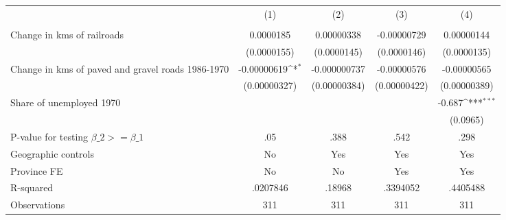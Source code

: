 {
\def\sym#1{\ifmmode^{#1}\else\(^{#1}\)\fi}
\begin{tabular}{l*{4}{c}}
\hline\hline
                &\multicolumn{1}{c}{(1)}&\multicolumn{1}{c}{(2)}&\multicolumn{1}{c}{(3)}&\multicolumn{1}{c}{(4)}\\
                &\multicolumn{1}{c}{}&\multicolumn{1}{c}{}&\multicolumn{1}{c}{}&\multicolumn{1}{c}{}\\
\hline
Change in kms of railroads&0.0000185         &0.00000338         &-0.00000729         &0.00000144         \\
                &(0.0000155)         &(0.0000145)         &(0.0000146)         &(0.0000135)         \\
[1em]
Change in kms of paved and gravel roads 1986-1970&-0.00000619\sym{*}  &-0.000000737         &-0.00000576         &-0.00000565         \\
                &(0.00000327)         &(0.00000384)         &(0.00000422)         &(0.00000389)         \\
[1em]
Share of unemployed 1970&                  &                  &                  &   -0.687\sym{***}\\
                &                  &                  &                  & (0.0965)         \\
\hline
P-value for testing $\beta\_{2} >= \beta\_{1}$&      .05         &     .388         &     .542         &     .298         \\
Geographic controls&       No         &      Yes         &      Yes         &      Yes         \\
Province FE     &       No         &       No         &      Yes         &      Yes         \\
R-squared       & .0207846         &   .18968         & .3394052         & .4405488         \\
Observations    &      311         &      311         &      311         &      311         \\
\hline\hline
\end{tabular}
}

